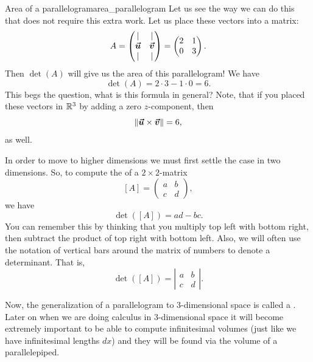\begin{ex}{Area of a parallelogram}{area_parallelogram}
        Let us see the way we can do this that does not require this extra work.  Let us place these vectors into a matrix:
        \[
        A=\begin{pmatrix} \vert & \vert \\ \boldsymbol{\boldsymbol{\vec{u}}} & \boldsymbol{\boldsymbol{\vec{v}}} \\ \vert & \vert \end{pmatrix}=
        \begin{pmatrix} 2 & 1\\ 0 & 3 \end{pmatrix}.
        \]
        Then $\det(A)$ will give us the area of this parallelogram! We have
        \[
        \det(A)=2\cdot 3 - 1\cdot 0 = 6.
        \]
        This begs the question, what is this formula in general? Note, that if you placed these vectors in $\mathbb{R}^3$ by adding a zero $z$-component, then 
        \[
        \|\boldsymbol{\boldsymbol{\vec{u}}} \times \boldsymbol{\boldsymbol{\vec{v}}} \| = 6,
        \]
        as well.
        \end{ex}
        
        In order to move to higher dimensions we must first settle the case in two dimensions.  So, to compute the  of a $2\times 2$-matrix
        \[
        [A]=\begin{pmatrix} a & b\\ c & d \end{pmatrix},
        \]
        we have
        \[
        \det([A]) = ad-bc.
        \]
        You can remember this by thinking that you multiply top left with bottom right, then subtract the product of top right with bottom left. Also, we will often use the notation of vertical bars around the matrix of numbers to denote a determinant. That is,
        \[
        \det([A]) = \left| \begin{matrix} a & b \\ c & d \end{matrix} \right|.
        \]
        
        Now, the generalization of a parallelogram to 3-dimensional space is called a .  Later on when we are doing calculus in 3-dimensional space it will become extremely important to be able to compute infinitesimal volumes (just like we have infinitesimal lengths $dx$) and they will be found via the volume of a parallelepiped.
        
